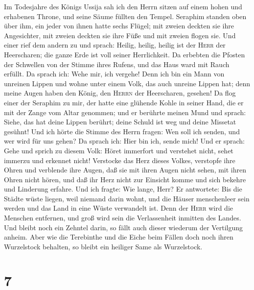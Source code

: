  Im Todesjahre des Königs Ussija sah ich den Herrn sitzen
auf einem hohen und erhabenen Throne, und seine Säume füllten den
Tempel.  Seraphim standen oben über ihm, ein jeder von
ihnen hatte sechs Flügel; mit zweien deckten sie ihre Angesichter, mit
zweien deckten sie ihre Füße und mit zweien flogen sie. 
Und einer rief dem andern zu und sprach: Heilig, heilig, heilig ist der
\textsc{Herr} der Heerscharen; die ganze Erde ist voll seiner
Herrlichkeit.  Da erbebten die Pfosten der Schwellen von
der Stimme ihres Rufens, und das Haus ward mit Rauch erfüllt.
 Da sprach ich: Wehe mir, ich vergehe! Denn ich bin ein
Mann von unreinen Lippen und wohne unter einem Volk, das auch unreine
Lippen hat; denn meine Augen haben den König, den \textsc{Herrn} der
Heerscharen, gesehen!  Da flog einer der Seraphim zu mir,
der hatte eine glühende Kohle in seiner Hand, die er mit der Zange vom
Altar genommen;  und er berührte meinen Mund und sprach:
Siehe, das hat deine Lippen berührt; deine Schuld ist weg und deine
Missetat gesühnt!  Und ich hörte die Stimme des Herrn
fragen: Wen soll ich senden, und wer wird für uns gehen? Da sprach ich:
Hier bin ich, sende mich!  Und er sprach: Gehe und sprich
zu diesem Volk: Höret immerfort und verstehet nicht, sehet immerzu und
erkennet nicht!  Verstocke das Herz dieses Volkes,
verstopfe ihre Ohren und verblende ihre Augen, daß sie mit ihren Augen
nicht sehen, mit ihren Ohren nicht hören, und daß ihr Herz nicht zur
Einsicht komme und sich bekehre und Linderung erfahre. 
Und ich fragte: Wie lange, Herr? Er antwortete: Bis die Städte wüste
liegen, weil niemand darin wohnt, und die Häuser menschenleer sein
werden und das Land in eine Wüste verwandelt ist.  Denn
der \textsc{Herr} wird die Menschen entfernen, und groß wird sein die
Verlassenheit inmitten des Landes.  Und bleibt noch ein
Zehntel darin, so fällt auch dieser wiederum der Vertilgung anheim. Aber
wie die Terebinthe und die Eiche beim Fällen doch noch ihren Wurzelstock
behalten, so bleibt ein heiliger Same als Wurzelstock.

\hypertarget{section-6}{%
\section{7}\label{section-6}}

